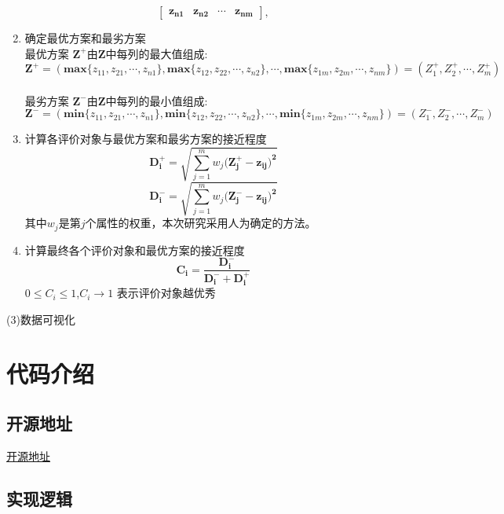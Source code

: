 \documentclass[UTF8]{ctexart}
\begin{document}
\begin{enumerate}
\begin{equation}
\begin{bmatrix}
		\bm{z_{n1}} & \bm{z_{n2}} & \cdots & \bm{z_{nm}}
		\end{bmatrix},
		\end{equation}
		\item 确定最优方案和最劣方案 \\
		最优方案 $\bm{Z^{+}}$由$\bm{Z}$中每列的最大值组成:
		\begin{equation}
		\bm{Z^{+}}=(\bm{max}\{z_{11},z_{21},\cdots,z_{n1}\},\bm{max}\{z_{12},z_{22},\cdots,z_{n2}\},\cdots,\bm{max}\{z_{1m},z_{2m},\cdots,z_{nm}\})
		=(Z_1^{+},Z_2^{+},\cdots,Z_m^{+})
		\end{equation}\\
		最劣方案 $\bm{Z^{-}}$由$\bm{Z}$中每列的最小值组成:
		\begin{equation}
		\bm{Z^{-}}=(\bm{min}\{z_{11},z_{21},\cdots,z_{n1}\},\bm{min}\{z_{12},z_{22},\cdots,z_{n2}\},\cdots,\bm{min}\{z_{1m},z_{2m},\cdots,z_{nm}\})=(Z_1^{-},Z_2^{-},\cdots,Z_m^{-})
		\end{equation}
		\item 计算各评价对象与最优方案和最劣方案的接近程度
		\begin{equation}
		\bm{D_i^{+}}=\sqrt{\sum_{j=1}^m {w_j(\bm{Z_j^{+}-z_{ij})^2}}}
		\end{equation}
		\begin{equation}
		\bm{D_i^{-}}=\sqrt{\sum_{j=1}^m {w_j(\bm{Z_j^{-}-z_{ij})^2}}}
		\end{equation}
		其中$w_j$是第$j$个属性的权重，本次研究采用人为确定的方法。
		\item 计算最终各个评价对象和最优方案的接近程度
		\begin{equation}
		\bm{C_i}=\frac{\bm{D_i^{-}}}{\bm{D_i^{-}}+\bm{D_i^{+}}}
		\end{equation}
		$0 \leq C_i \leq 1$,$C_i \rightarrow 1$ 表示评价对象越优秀
	\end{enumerate}
	\par (3)数据可视化
	\section{代码介绍}\label{sec3}
	\subsection{开源地址}
	\href{https://github.com/Coolingsky167/DataScienceHomework}{开源地址}
	\subsection{实现逻辑}
	
\end{document}
